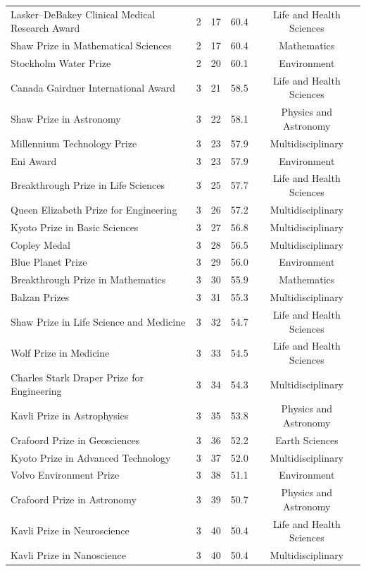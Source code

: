 \begin{longtable}{>{\raggedright\arraybackslash}p{7.2cm}cccc}
Lasker–DeBakey Clinical Medical Research Award & 2 & 17 & 60.4 & Life and Health Sciences \\ 
Shaw Prize in Mathematical Sciences & 2 & 17 & 60.4 & Mathematics \\ 
Stockholm Water Prize & 2 & 20 & 60.1 & Environment \\ 
Canada Gairdner International Award & 3 & 21 & 58.5 & Life and Health Sciences \\ 
Shaw Prize in Astronomy & 3 & 22 & 58.1 & Physics and Astronomy \\ 
Millennium Technology Prize & 3 & 23 & 57.9 & Multidisciplinary \\ 
Eni Award & 3 & 23 & 57.9 & Environment \\ 
Breakthrough Prize in Life Sciences & 3 & 25 & 57.7 & Life and Health Sciences \\ 
Queen Elizabeth Prize for Engineering & 3 & 26 & 57.2 & Multidisciplinary \\ 
Kyoto Prize in Basic Sciences & 3 & 27 & 56.8 & Multidisciplinary \\ 
Copley Medal & 3 & 28 & 56.5 & Multidisciplinary \\ 
Blue Planet Prize & 3 & 29 & 56.0 & Environment \\ 
Breakthrough Prize in Mathematics & 3 & 30 & 55.9 & Mathematics \\ 
Balzan Prizes & 3 & 31 & 55.3 & Multidisciplinary \\ 
Shaw Prize in Life Science and Medicine & 3 & 32 & 54.7 & Life and Health Sciences \\ 
Wolf Prize in Medicine & 3 & 33 & 54.5 & Life and Health Sciences \\ 
Charles Stark Draper Prize for Engineering & 3 & 34 & 54.3 & Multidisciplinary \\ 
Kavli Prize in Astrophysics & 3 & 35 & 53.8 & Physics and Astronomy \\ 
Crafoord Prize in Geosciences & 3 & 36 & 52.2 & Earth Sciences \\ 
Kyoto Prize in Advanced Technology & 3 & 37 & 52.0 & Multidisciplinary \\ 
Volvo Environment Prize & 3 & 38 & 51.1 & Environment \\ 
Crafoord Prize in Astronomy & 3 & 39 & 50.7 & Physics and Astronomy \\ 
Kavli Prize in Neuroscience & 3 & 40 & 50.4 & Life and Health Sciences \\ 
Kavli Prize in Nanoscience & 3 & 40 & 50.4 & Multidisciplinary \\ 

\end{longtable}
